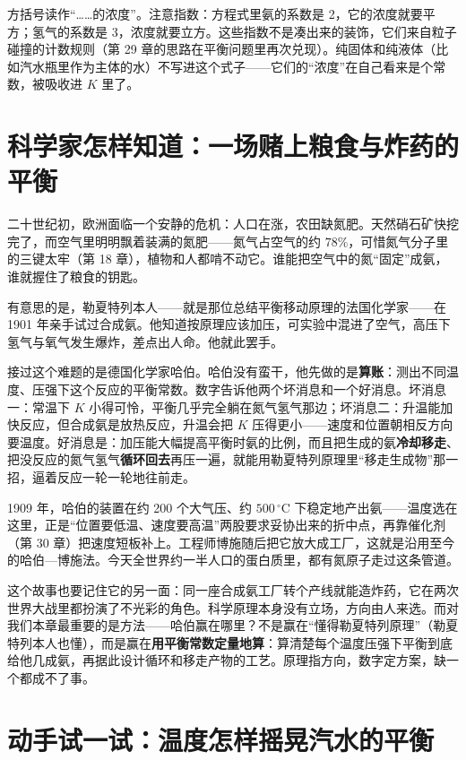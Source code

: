 方括号读作“……的浓度”。注意指数：方程式里氨的系数是 2，它的浓度就要平方；氢气的系数是 3，浓度就要立方。这些指数不是凑出来的装饰，它们来自粒子碰撞的计数规则（第 29 章的思路在平衡问题里再次兑现）。纯固体和纯液体（比如汽水瓶里作为主体的水）不写进这个式子——它们的“浓度”在自己看来是个常数，被吸收进 $K$ 里了。

\section{科学家怎样知道：一场赌上粮食与炸药的平衡}

\begin{zhengju}
二十世纪初，欧洲面临一个安静的危机：人口在涨，农田缺氮肥。天然硝石矿快挖完了，而空气里明明飘着装满的氮肥——氮气占空气的约 $78\%$，可惜氮气分子里的三键太牢（第 18 章），植物和人都啃不动它。谁能把空气中的氮“固定”成氨，谁就握住了粮食的钥匙。

有意思的是，勒夏特列本人——就是那位总结平衡移动原理的法国化学家——在 1901 年亲手试过合成氨。他知道按原理应该加压，可实验中混进了空气，高压下氢气与氧气发生爆炸，差点出人命。他就此罢手。

接过这个难题的是德国化学家哈伯。哈伯没有蛮干，他先做的是\textbf{算账}：测出不同温度、压强下这个反应的平衡常数。数字告诉他两个坏消息和一个好消息。坏消息一：常温下 $K$ 小得可怜，平衡几乎完全躺在氮气氢气那边；坏消息二：升温能加快反应，但合成氨是放热反应，升温会把 $K$ 压得更小——速度和位置朝相反方向要温度。好消息是：加压能大幅提高平衡时氨的比例，而且把生成的氨\textbf{冷却移走}、把没反应的氮气氢气\textbf{循环回去}再压一遍，就能用勒夏特列原理里“移走生成物”那一招，逼着反应一轮一轮地往前走。

1909 年，哈伯的装置在约 200 个大气压、约 $500\,^{\circ}\mathrm{C}$ 下稳定地产出氨——温度选在这里，正是“位置要低温、速度要高温”两股要求妥协出来的折中点，再靠催化剂（第 30 章）把速度短板补上。工程师博施随后把它放大成工厂，这就是沿用至今的哈伯—博施法。今天全世界约一半人口的蛋白质里，都有氮原子走过这条管道。

这个故事也要记住它的另一面：同一座合成氨工厂转个产线就能造炸药，它在两次世界大战里都扮演了不光彩的角色。科学原理本身没有立场，方向由人来选。而对我们本章最重要的是方法——哈伯赢在哪里？不是赢在“懂得勒夏特列原理”（勒夏特列本人也懂），而是赢在\textbf{用平衡常数定量地算}：算清楚每个温度压强下平衡到底给他几成氨，再据此设计循环和移走产物的工艺。原理指方向，数字定方案，缺一个都成不了事。
\end{zhengju}

\section{动手试一试：温度怎样摇晃汽水的平衡}

